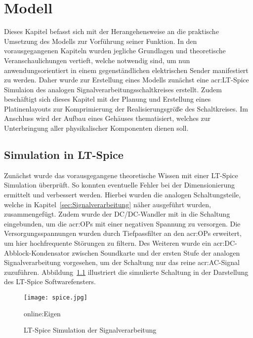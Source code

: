 
\chapter{Modell}
\label{sec:modell}
Dieses Kapitel befasst sich mit der Herangehensweise an die praktische Umsetzung des Modells zur Vorführung seiner Funktion. In den vorausgegangenen Kapiteln wurden jegliche Grundlagen und theoretische Veranschaulichungen vertieft, welche notwendig sind, um nun anwendungsorientiert in einem gegenständlichen elektrischen Sender manifestiert zu werden. Daher wurde zur Erstellung eines Modells zunächst eine \gls{acr:LT}-Spice Simulaion des analogen Signalverarbeitungsschaltkreises erstellt. Zudem beschäftigt sich dieses Kapitel mit der Planung und Erstellung eines Platinenlayouts zur Komprimierung der Realisierungsgröße des Schaltkreises. Im Anschluss wird der Aufbau eines Gehäuses thematisiert, welches zur Unterbringung aller physikalischer Komponenten dienen soll.

\section{Simulation in LT-Spice}
\label{sec:simlt}

Zunächst wurde das vorausgegangene theoretische Wissen mit einer LT-Spice Simulation überprüft. So konnten eventuelle Fehler bei der Dimensionierung ermittelt und verbessert werden. Hierbei wurden die analogen Schaltungsteile, welche in Kapitel~\ref{sec:Signalverarbeitung} näher ausgeführt wurden, zusammengefügt. Zudem wurde der DC/DC-Wandler mit in die Schaltung eingebunden, um die \gls{acr:OP}s mit einer negativen Spannung zu versorgen. Die Versorgungsspannungen wurden durch Tiefpassfilter an den \gls{acr:OP}s erweitert, um hier hochfrequente Störungen zu filtern. Des Weiteren wurde ein \gls{acr:DC}-Abblock-Kondensator zwischen Soundkarte und der ersten Stufe der analogen Signalverarbeitung vorgesehen, um der Schaltung nur das reine \gls{acr:AC}-Signal zuzuführen. Abbildung~\ref{fig:spice} illustriert die simulierte Schaltung in der Darstellung des LT-Spice Softwarefensters.

\begin{figure}[H]
	\centering
	\texttt{[image: spice.jpg]}
	\caption[LT-Spice Simulation der Signalverarbeitung]{LT-Spice Simulation der Signalverarbeitung} \gls{online:Eigen}
	\label{fig:spice}
\end{figure}

